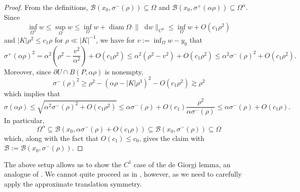 \documentclass[final,12pt, leqno]{brownthesis}
\DeclareMathOperator{\diam}{diam}
\newcommand*\dif{\mathop{}\!\mathrm{d}}
\theoremstyle{definition}
\numberwithin{equation}{section}
\begin{document}
\begin{proof}
From the definitions, $\mathscr B(x_0, \sigma^-(\rho)) \subseteq \Omega$ and $\mathscr B(x_0, \sigma^+(\alpha \rho)) \subseteq \Omega^\alpha$.
Since
$$\inf_{\Omega^\alpha} w \leq \sup_\Omega w \leq \inf_\Omega w + \diam \Omega \cdot \|\dif w\|_{C^0} \leq \inf_\Omega w + O(c_1 \rho^2)$$
and $|K| \rho^2 \leq c_1 \rho$ for $\rho \ll |K|^{-1}$, we have for $v := \inf_\Omega w - y_0$ that
$$\sigma^+(\alpha \rho)^2 = \alpha^2\left(\rho^2 - \frac{v^2}{\alpha^2}\right) + O(c_1 \rho^2) \leq \alpha^2(\rho^2 - v^2) + O(c_1 \rho^2) \leq \alpha^2 \sigma^-(\rho)^2 + O(c_1 \rho^2).$$
Moreover, since $\partial U \cap B(P, \alpha \rho)$ is nonempty,
$$\sigma^-(\rho)^2 \geq \rho^2 - (\alpha \rho - |K|\rho^3)^2 - O(c_1 \rho^2) \gtrsim \rho^2$$
which implies that
$$\sigma(\alpha \rho) \leq \sqrt{\alpha^2 \sigma^-(\rho)^2 + O(c_1 \rho^2)} \leq \alpha \sigma^-(\rho) + O(c_1) \frac{\rho^2}{\alpha \sigma^-(\rho)} \leq \alpha \sigma^-(\rho) + O(c_1 \rho).$$
In particular,
$$\Omega^\alpha \subseteq \mathscr B(x_0, \alpha \sigma^-(\rho) + O(c_1 \rho)) \subseteq \mathscr B(x_0, \sigma^-(\rho)) \subseteq \Omega$$
which, along with the fact that $O(c_1) \leq c_0$, gives the claim with $\mathscr B := \mathscr B(x_0, \sigma^-(\rho))$.
\end{proof}

The above setup allows us to show the $C^1$ case of the de Giorgi lemma, an analogue of \cite[Lemma 6.4]{Giusti77}.
We cannot quite proceed as in \cite{Giusti77}, however, as we need to carefully apply the approximate translation symmetry.
\end{document}
